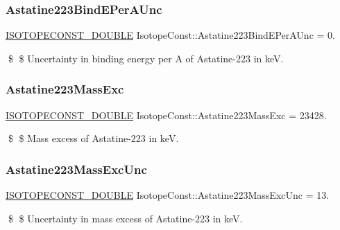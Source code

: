 \subsubsection{\texorpdfstring{Astatine223\+Bind\+E\+Per\+A\+Unc}{Astatine223BindEPerAUnc}}
{\footnotesize\ttfamily \mbox{\hyperlink{group___isotope_const-_macros_ga8f45a7272ce02c0b4c65c44636ed719a}{I\+S\+O\+T\+O\+P\+E\+C\+O\+N\+S\+T\+\_\+\+D\+O\+U\+B\+LE}} Isotope\+Const\+::\+Astatine223\+Bind\+E\+Per\+A\+Unc = 0.}

\$ \$ Uncertainty in binding energy per A of Astatine-\/223 in keV. \mbox{\label{group___isotope_const-_astatine-_at223_gaffb9148f697edad9ed27cb59e3268d68}} 
\subsubsection{\texorpdfstring{Astatine223\+Mass\+Exc}{Astatine223MassExc}}
{\footnotesize\ttfamily \mbox{\hyperlink{group___isotope_const-_macros_ga8f45a7272ce02c0b4c65c44636ed719a}{I\+S\+O\+T\+O\+P\+E\+C\+O\+N\+S\+T\+\_\+\+D\+O\+U\+B\+LE}} Isotope\+Const\+::\+Astatine223\+Mass\+Exc = 23428.}

\$ \$ Mass excess of Astatine-\/223 in keV. \mbox{\label{group___isotope_const-_astatine-_at223_gad769ae1eb6df6adfb8d5d2a2026e41d6}} 
\subsubsection{\texorpdfstring{Astatine223\+Mass\+Exc\+Unc}{Astatine223MassExcUnc}}
{\footnotesize\ttfamily \mbox{\hyperlink{group___isotope_const-_macros_ga8f45a7272ce02c0b4c65c44636ed719a}{I\+S\+O\+T\+O\+P\+E\+C\+O\+N\+S\+T\+\_\+\+D\+O\+U\+B\+LE}} Isotope\+Const\+::\+Astatine223\+Mass\+Exc\+Unc = 13.}

\$ \$ Uncertainty in mass excess of Astatine-\/223 in keV. \mbox{\label{group___isotope_const-_astatine-_at223_ga35dada7896ff59f0c26319f972d353e1}} 
